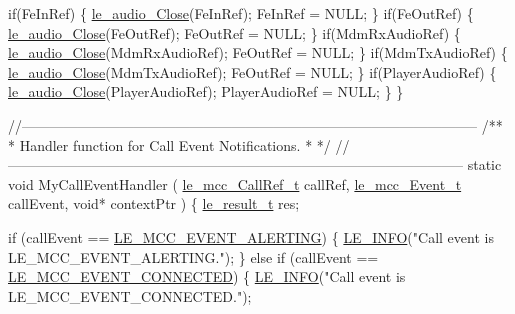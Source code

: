 \begin{DoxyCodeInclude}
{{{{{{{{{{    \textcolor{keywordflow}{if}(FeInRef)
    \{
        \hyperlink{le__audio__interface_8h_abafeb411da7b1a14b2d5777fc1d3e394}{le\_audio\_Close}(FeInRef);
        FeInRef = NULL;
    \}
    \textcolor{keywordflow}{if}(FeOutRef)
    \{
        \hyperlink{le__audio__interface_8h_abafeb411da7b1a14b2d5777fc1d3e394}{le\_audio\_Close}(FeOutRef);
        FeOutRef = NULL;
    \}
    \textcolor{keywordflow}{if}(MdmRxAudioRef)
    \{
        \hyperlink{le__audio__interface_8h_abafeb411da7b1a14b2d5777fc1d3e394}{le\_audio\_Close}(MdmRxAudioRef);
        FeOutRef = NULL;
    \}
    \textcolor{keywordflow}{if}(MdmTxAudioRef)
    \{
        \hyperlink{le__audio__interface_8h_abafeb411da7b1a14b2d5777fc1d3e394}{le\_audio\_Close}(MdmTxAudioRef);
        FeOutRef = NULL;
    \}
    \textcolor{keywordflow}{if}(PlayerAudioRef)
    \{
        \hyperlink{le__audio__interface_8h_abafeb411da7b1a14b2d5777fc1d3e394}{le\_audio\_Close}(PlayerAudioRef);
        PlayerAudioRef = NULL;
    \}
\}

\textcolor{comment}{//--------------------------------------------------------------------------------------------------}\textcolor{comment}{}
\textcolor{comment}{/**}
\textcolor{comment}{ * Handler function for Call Event Notifications.}
\textcolor{comment}{ *}
\textcolor{comment}{ */}
\textcolor{comment}{//--------------------------------------------------------------------------------------------------}
\textcolor{keyword}{static} \textcolor{keywordtype}{void} MyCallEventHandler
(
    \hyperlink{le__mcc__interface_8h_a8ae6dac3ca12854884d63e17d5388a7a}{le\_mcc\_CallRef\_t}   callRef,
    \hyperlink{le__mcc__interface_8h_aefc4679ffa76d0e04c578572c22f06cf}{le\_mcc\_Event\_t}     callEvent,
    \textcolor{keywordtype}{void}*              contextPtr
)
\{
    \hyperlink{le__basics_8h_a1cca095ed6ebab24b57a636382a6c86c}{le\_result\_t}         res;

    \textcolor{keywordflow}{if} (callEvent == \hyperlink{le__mcc__interface_8h_aefc4679ffa76d0e04c578572c22f06cfa05261a9fdb7ee59a0dae1cc27bb30e07}{LE\_MCC\_EVENT\_ALERTING})
    \{
        \hyperlink{le__log_8h_a23e6d206faa64f612045d688cdde5808}{LE\_INFO}(\textcolor{stringliteral}{"Call event is LE\_MCC\_EVENT\_ALERTING."});
    \}
    \textcolor{keywordflow}{else} \textcolor{keywordflow}{if} (callEvent == \hyperlink{le__mcc__interface_8h_aefc4679ffa76d0e04c578572c22f06cfa86702531207c50314b10ae3278c7ca0d}{LE\_MCC\_EVENT\_CONNECTED})
    \{
        \hyperlink{le__log_8h_a23e6d206faa64f612045d688cdde5808}{LE\_INFO}(\textcolor{stringliteral}{"Call event is LE\_MCC\_EVENT\_CONNECTED."});

}}}}}}}}}}
\end{DoxyCodeInclude}
